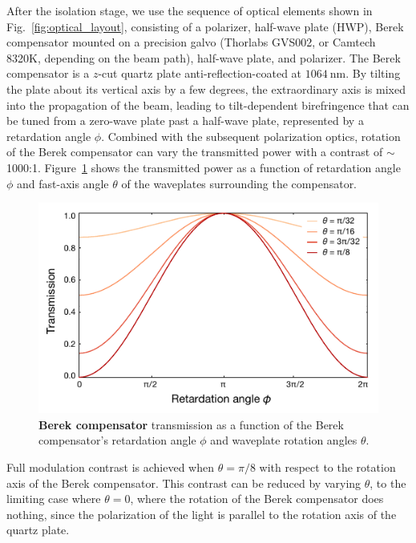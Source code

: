 \documentclass[twocolumn,aip,rsi,reprint,bibnotes]{revtex4-1}
\newcommand\unit[2]{\ensuremath{#1~\mathrm{{#2}}}}
\begin{document}
After the isolation stage, we use the sequence of optical elements shown in Fig.~\ref{fig:optical_layout}, consisting of a polarizer, half-wave plate (HWP), Berek compensator mounted on a precision galvo (Thorlabs GVS002, or Camtech 8320K, depending on the beam path), half-wave plate, and polarizer.
The Berek compensator is a $z$-cut quartz plate anti-reflection-coated at \unit{1064}{nm}.
By tilting the plate about its vertical axis by a few degrees, the extraordinary axis is mixed into the propagation of the beam, leading to tilt-dependent birefringence that can be tuned from a zero-wave plate past a half-wave plate, represented by a retardation angle $\phi$.
Combined with the subsequent polarization optics, rotation of the Berek compensator can vary the transmitted power with a contrast of $\sim$1000:1.
Figure~\ref{fig:berek} shows the transmitted power as a function of retardation angle $\phi$ and fast-axis angle $\theta$ of the waveplates surrounding the compensator.
\begin{figure}
  \begin{center}
    \includegraphics{Figure4.pdf}
    \caption{\textbf{Berek compensator} transmission as a function of the Berek compensator's retardation angle $\phi$ and waveplate rotation angles $\theta$.}\label{fig:berek}
  \end{center}
\end{figure}

Full modulation contrast is achieved when $\theta=\pi/8$ with respect to the rotation axis of the Berek compensator.
This contrast can be reduced by varying $\theta$, to the limiting case where $\theta=0$, where the rotation of the Berek compensator does nothing, since the polarization of the light is parallel to the rotation axis of the quartz plate.
\end{document}
